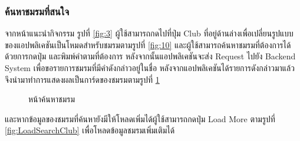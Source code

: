 \documentclass[14pt,oneside,openright,a4paper]{cpe-thai-project}
\begin{document}
\subsubsection{ค้นหาชมรมที่สนใจ}
จากหน้าแนะนำกิจกรรม รูปที่ \ref{fig:3}  
ผู้ใช้สามารถกดไปที่ปุ่ม Club ที่อยู่ด้านล่างเพื่อเปลี่ยนรูปแบบของแอปพลิเคชันเป็นโหมดสำหรับชมรมตามรูปที่ \ref{fig:10} 
และผู้ใช้สามารถค้นหาชมรมที่ต้องการได้ด้วยการกดปุ่ม และพิมพ์คำตามที่ต้องการ 
หลังจากนั้นแอปพลิเคชันจะส่ง Request ไปยัง Backend System เพื่อขอรายการชมรมที่มีคำดังกล่าวอยู่ในชื่อ หลังจากแอปพลิเคชันได้รายการดังกล่าวมาแล้วจึงนำมาทำการแสดงผลเป็นการ์ดของชมรมตามรูปที่ \ref{fig:11}  

\begin{figure}[H]\centering
  \setlength{\fboxrule}{0.5mm}
  \setlength{\fboxsep}{0.5cm}
  \caption{หน้าค้นหาชมรม}\label{fig:11}
\end{figure}

และหากข้อมูลของชมรมที่ค้นหายังมีให้โหลดเพิ่มได้ผู้ใช้สามารถกดปุ่ม Load More ตามรูปที่ \ref{fig:LoadSearchClub} เพื่อโหลดข้อมูลชมรมเพิ่มเติมได้
\end{document}

